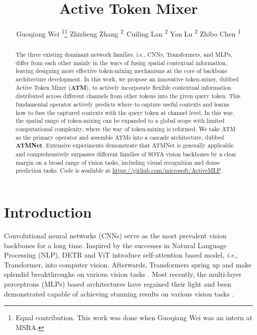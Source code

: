 \documentclass[letterpaper]{article} \usepackage{aaai23v}  \usepackage{times}  \usepackage{helvet}  \usepackage{courier}  \usepackage[hyphens]{url}  \usepackage{graphicx} \urlstyle{rm} \def\UrlFont{\rm}  \usepackage{caption} \frenchspacing  \setlength{\pdfpagewidth}{8.5in}  \setlength{\pdfpageheight}{11in}  \usepackage{algorithm}
\title{Active Token Mixer}
\author {
Guoqiang Wei \textsuperscript{\rm 1}\thanks{Equal contribution. This work was done when Guoqiang Wei was an intern at MSRA.}\quad
    Zhizheng Zhang \textsuperscript{\rm 2\,}\quad
Cuiling Lan \textsuperscript{\rm 2}\quad
    Yan Lu \textsuperscript{\rm 2}\quad
    Zhibo Chen \textsuperscript{\rm 1}
}
\newcommand{\ieno}{\textit{i}.\textit{e}.}
\begin{document}
\maketitle

\begin{abstract}
The three existing dominant network families, i.e., CNNs, Transformers, and MLPs, differ from each other mainly in the ways of fusing spatial contextual information,
leaving designing more effective token-mixing mechanisms at the core of backbone architecture development. 
In this work, we propose an innovative token-mixer, dubbed Active Token Mixer (\textbf{ATM}), to actively incorporate flexible contextual information distributed across different channels from other tokens into the given query token. 
This fundamental operator actively predicts where to capture useful contexts and learns how to fuse the captured contexts with the query token at channel level. 
In this way, the spatial range of token-mixing can be 
expanded to a global scope with limited computational complexity, where the way of token-mixing is reformed. 
We take ATM as the primary operator and assemble ATMs into a cascade architecture, dubbed \textbf{ATMNet}.
Extensive experiments demonstrate that ATMNet is generally applicable and comprehensively surpasses different families of SOTA vision backbones by a clear margin on a broad range of vision tasks, including visual recognition and dense prediction tasks. Code is available at \url{https://github.com/microsoft/ActiveMLP}.
\end{abstract}

\section{Introduction}
Convolutional neural networks (CNNs) \cite{krizhevsky2012imagenetalexnet,simonyan2014veryVGG,szegedy2015GoogleNet,szegedy2016InceptionV3,szegedy2017inceptionV4,chollet2017xception,he2016deepresnet,huang2017DenseNet,xie2017ResNeXt,zhang2020resnest} serve as the most prevalent vision backbones for a long time. Inspired by the successes in Natural Language Processing (NLP), DETR \cite{carion2020DETR} and ViT \cite{alexander2021vit} introduce self-attention based model, \ieno, Transformer, into computer vision. 
Afterwards, Transformers spring up and make splendid breakthroughs 
on various vision tasks \cite{liu2021swin,he2021TransReID,wang2021TransTrack,xie2021SegFormer,cheng2021MaskFormer,lin2021PoseTransformer,he2021MAE}. 
Most recently, the multi-layer perceptrons (MLPs) based architectures \cite{tolstikhin2021mlpmixer,lian2021asmlp} have regained their light and been demonstrated capable of achieving stunning results on various vision tasks \cite{touvron2021resmlp,tolstikhin2021mlpmixer,chen2022cyclemlp,lian2021asmlp,zhang2021morphmlp,tang2021sparsesMLP}.
\end{document}

